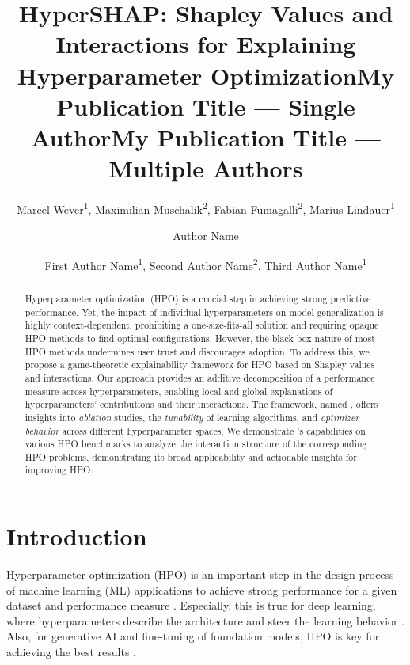 \documentclass[letterpaper]{article} %
\title{HyperSHAP: Shapley Values and Interactions for Explaining\\ Hyperparameter Optimization}
\author {
    Marcel Wever\textsuperscript{\rm 1},
    Maximilian Muschalik\textsuperscript{\rm 2},
    Fabian Fumagalli\textsuperscript{\rm 2},
    Marius Lindauer\textsuperscript{\rm 1}
}
\title{My Publication Title --- Single Author}
\author {
    Author Name
}
\title{My Publication Title --- Multiple Authors}
\author {
    First Author Name\textsuperscript{\rm 1},
    Second Author Name\textsuperscript{\rm 2},
    Third Author Name\textsuperscript{\rm 1}
}
\begin{document}
\maketitle

\begin{abstract}
Hyperparameter optimization (HPO) is a crucial step in achieving strong predictive performance.
Yet, the impact of individual hyperparameters on model generalization is highly context-dependent, prohibiting a one-size-fits-all solution and requiring opaque HPO methods to find optimal configurations.
However, the black-box nature of most HPO methods undermines user trust and discourages adoption. 
To address this, we propose a game-theoretic explainability framework for HPO based on Shapley values and interactions.
Our approach provides an additive decomposition of a performance measure across hyperparameters, enabling local and global explanations of hyperparameters' contributions and their interactions. 
The framework, named \tool, offers insights into \emph{ablation} studies, the \emph{tunability} of learning algorithms, and \emph{optimizer behavior} across different hyperparameter spaces.
We demonstrate \tool's capabilities on various HPO benchmarks to analyze the interaction structure of the corresponding HPO problems, demonstrating its broad applicability and actionable insights for improving HPO.
\end{abstract}

\begin{links}
\end{links}

\section{Introduction}

Hyperparameter optimization (HPO) is an important step in the design process of machine learning (ML) applications to achieve strong performance for a given dataset and performance measure \citep{snoek-icml14a,DBLP:journals/widm/BischlBLPRCTUBBDL23}. Especially, this is true for deep learning, where hyperparameters describe the architecture and steer the learning behavior \citep{zimmer-tpami21a}. Also, for generative AI and fine-tuning of foundation models, HPO is key for achieving the best results \citep{DBLP:conf/acl/YinCSJCL20,llmFinetuningHPO,DBLP:conf/automl/00010A23}.
\end{document}
